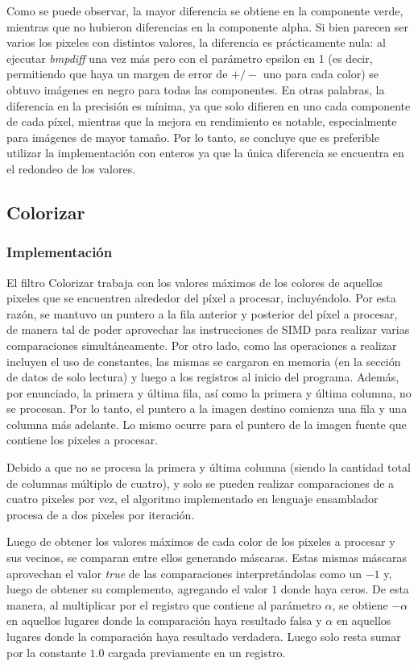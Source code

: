 \documentclass[a4paper]{article}
\begin{document}
Como se puede observar, la mayor diferencia se obtiene en la componente verde, mientras que no hubieron diferencias en la componente alpha. Si bien parecen ser varios los pixeles con distintos valores, la diferencia es prácticamente nula: al ejecutar \textit{bmpdiff} una vez más pero con el parámetro epsilon en 1 (es decir, permitiendo que haya un margen de error de $+/-$ uno para cada color) se obtuvo imágenes en negro para todas las componentes. En otras palabras, la diferencia en la precisión es mínima, ya que solo difieren en uno cada componente de cada píxel, mientras que la mejora en rendimiento es notable, especialmente para imágenes de mayor tamaño. Por lo tanto, se concluye que es preferible utilizar la implementación con enteros ya que la única diferencia se encuentra en el redondeo de los valores.

\newpage

\subsection{Colorizar}
\subsubsection{Implementación}

El filtro Colorizar trabaja con los valores máximos de los colores de aquellos pixeles que se encuentren alrededor del píxel a procesar, incluyéndolo. Por esta razón, se mantuvo un puntero a la fila anterior y posterior del píxel a procesar, de manera tal de poder aprovechar las instrucciones de SIMD para realizar varias comparaciones simultáneamente. Por otro lado, como las operaciones a realizar incluyen el uso de constantes, las mismas se cargaron en memoria (en la sección de datos de solo lectura) y luego a los registros al inicio del programa. Además, por enunciado, la primera y última fila, así como la primera y última columna, no se procesan. Por lo tanto, el puntero a la imagen destino comienza una fila y una columna más adelante. Lo mismo ocurre para el puntero de la imagen fuente que contiene los pixeles a procesar. 

Debido a que no se procesa la primera y última columna (siendo la cantidad total de columnas múltiplo de cuatro), y solo se pueden realizar comparaciones de a cuatro pixeles por vez, el algoritmo implementado en lenguaje ensamblador procesa de a dos pixeles por iteración.

Luego de obtener los valores máximos de cada color de los pixeles a procesar y sus vecinos, se comparan entre ellos generando máscaras. Estas mismas máscaras aprovechan el valor \textit{true} de las comparaciones interpretándolas como un $-1$ y, luego de obtener su complemento, agregando el valor $1$ donde haya ceros. De esta manera, al multiplicar por el registro que contiene al parámetro $\alpha$, se obtiene $-\alpha$ en aquellos lugares donde la comparación haya resultado falsa y $\alpha$ en aquellos lugares donde la comparación haya resultado verdadera. Luego solo resta sumar por la constante $1.0$ cargada previamente en un registro. 
\end{document}

